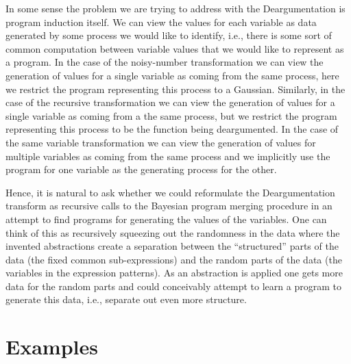 \documentclass[a4paper,10pt]{article}
\begin{document}
In some sense the problem we are trying to address with the Deargumentation is program induction itself.  We can view the values for each variable as data generated by some process we would like to identify, i.e., there is some sort of common computation between variable values that we would like to represent as a program.  In the case of the noisy-number transformation we can view the generation of values for a single variable as coming from the same process, here we restrict the program representing this process to a Gaussian.  Similarly, in the case of the recursive transformation we can view the generation of values for a single variable as coming from a the same process, but we restrict the program representing this process to be the function being deargumented.  In the case of the same variable transformation we can view the generation of values for multiple variables as coming from the same process and we implicitly use the program for one variable as the generating process for the other.  

Hence, it is natural to ask whether we could reformulate the Deargumentation transform as recursive calls to the Bayesian program merging procedure in an attempt to find programs for generating the values of the variables.  One can think of this as recursively squeezing out the randomness in the data where the invented abstractions create a separation between the ``structured'' parts of the data (the fixed common sub-expressions) and the random parts of the data (the variables in the expression patterns).  As an abstraction is applied one gets more data for the random parts and could conceivably attempt to learn a program to generate this data, i.e., separate out even more structure.


\newpage
\section{Examples}
\end{document}
